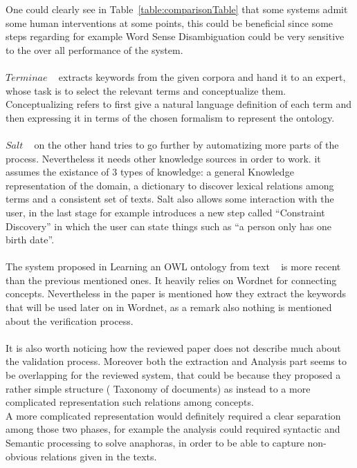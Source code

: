 \documentclass[4pt,a4paper,twocolumn]{article}
\begin{document}
One could clearly see in Table~\ref{table:comparisonTable} that some systems admit some human interventions at some points, this could be beneficial since some steps regarding for example Word Sense Disambiguation could be very sensitive to the over all performance of the system.\\
\\
$Terminae$ ~\cite{BiebowSzulman:99} extracts keywords from the given corpora and hand it to an expert, whose task is to select the relevant terms and conceptualize them. Conceptualizing refers to first give a natural language definition of each term and then expressing it in terms of the chosen formalism to represent the ontology.\\
\\
$Salt$ ~\cite{Lonsdale02pepperingknowledge} on the other hand tries to go further by automatizing more parts of the process. Nevertheless it needs other knowledge sources in order to work. it assumes the existance of 3 types of knowledge: a general Knowledge representation of the domain, a dictionary to discover lexical relations among terms and a consistent set of texts. Salt also allows some interaction with the user, in the last stage for example introduces a new step called ``Constraint Discovery'' in which the user can state things such as ``a person only has one birth date''. \\
\\
The system proposed in Learning an OWL ontology from text ~\cite{citeulike:136652} is more recent than the previous mentioned ones. It heavily relies on Wordnet for connecting concepts. Nevertheless in the paper is mentioned how they extract the keywords that will be used later on in Wordnet, as a remark also nothing is mentioned about the verification process.\\
\\
It is also worth noticing how the reviewed paper does not describe much about the validation process.
Moreover both the extraction and Analysis part seems to be overlapping for the reviewed system, that could be because they proposed a rather simple structure ( Taxonomy of documents) as instead to a more complicated representation such relations among concepts.\\
A more complicated representation would definitely required a clear separation among those two phases, for example the analysis could required syntactic and Semantic processing to solve anaphoras, in order to be able to capture non-obvious relations given in the texts.
\end{document}
